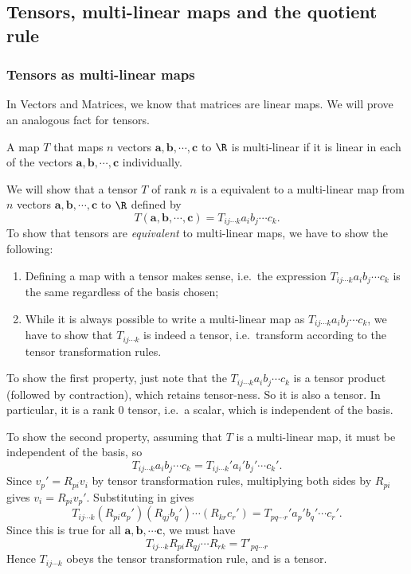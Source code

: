 \documentclass[a4paper]{article}
\begin{document}
\subsection{Tensors, multi-linear maps and the quotient rule}
\subsubsection*{Tensors as multi-linear maps}
In Vectors and Matrices, we know that matrices are linear maps. We will prove an analogous fact for tensors.

\begin{defi}
  A map $T$ that maps $n$ vectors $\mathbf{a}, \mathbf{b}, \cdots, \mathbf{c}$ to $\R$ is multi-linear if it is linear in each of the vectors $\mathbf{a}, \mathbf{b}, \cdots, \mathbf{c}$ individually.
\end{defi}

We will show that a tensor $T$ of rank $n$ is a equivalent to a multi-linear map from $n$ vectors $\mathbf{a}, \mathbf{b}, \cdots, \mathbf{c}$ to $\R$ defined by
\[
  T(\mathbf{a}, \mathbf{b}, \cdots, \mathbf{c}) = T_{ij \cdots k} a_ib_j\cdots c_k.
\]
To show that tensors are \emph{equivalent} to multi-linear maps, we have to show the following:
\begin{enumerate}
  \item Defining a map with a tensor makes sense, i.e.\ the expression $T_{ij\cdots k}a_ib_j\cdots c_k$ is the same regardless of the basis chosen;
  \item While it is always possible to write a multi-linear map as $T_{ij \cdots k} a_ib_j\cdots c_k$, we have to show that $T_{ij\cdots k}$ is indeed a tensor, i.e.\ transform according to the tensor transformation rules.
\end{enumerate}

To show the first property, just note that the $T_{ij \cdots k} a_ib_j\cdots c_k$ is a tensor product (followed by contraction), which retains tensor-ness. So it is also a tensor. In particular, it is a rank 0 tensor, i.e.\ a scalar, which is independent of the basis.

To show the second property, assuming that $T$ is a multi-linear map, it must be independent of the basis, so
\[
  T_{ij \cdots k} a_ib_j\cdots c_k = T_{ij\cdots k}' a_i' b_j' \cdots c_k'.
\]
Since $v_p' = R_{pi}v_i$ by tensor transformation rules, multiplying both sides by $R_{pi}$ gives $v_i = R_{pi} v_p'$. Substituting in gives
\[
  T_{ij\cdots k} (R_{pi}a_p')(R_{qj}b_q')\cdots (R_{kr}c_r') = T_{pq\cdots r}' a_p' b_q' \cdots c_r'.
\]
Since this is true for all $\mathbf{a}, \mathbf{b}, \cdots \mathbf{c}$, we must have
\[
  T_{ij\cdots k}R_{pi}R_{qj}\cdots R_{rk} = T'_{pq\cdots r}
\]
Hence $T_{ij\cdots k}$ obeys the tensor transformation rule, and is a tensor.
\end{document}
